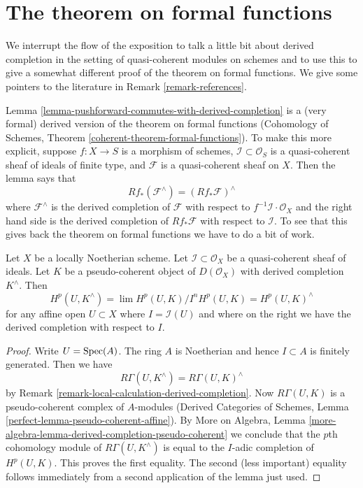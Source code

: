\section{The theorem on formal functions}
\label{section-formal-functions}

\noindent
We interrupt the flow of the exposition to talk a little bit about
derived completion in the setting of quasi-coherent modules on schemes
and to use this to give a somewhat different proof of the theorem on
formal functions. We give some pointers to the literature in
Remark \ref{remark-references}.

\medskip\noindent
Lemma \ref{lemma-pushforward-commutes-with-derived-completion} is a
(very formal) derived version of the theorem on formal functions
(Cohomology of Schemes, Theorem \ref{coherent-theorem-formal-functions}).
To make this more explicit, suppose $f : X \to S$ is a morphism of schemes,
$\mathcal{I} \subset \mathcal{O}_S$ is a quasi-coherent sheaf of ideals
of finite type,
and $\mathcal{F}$ is a quasi-coherent sheaf on $X$. Then the lemma says that
\begin{equation}
\label{equation-formal-functions}
Rf_*(\mathcal{F}^\wedge) = (Rf_*\mathcal{F})^\wedge
\end{equation}
where $\mathcal{F}^\wedge$ is the derived completion of $\mathcal{F}$
with respect to $f^{-1}\mathcal{I} \cdot \mathcal{O}_X$ and the right
hand side is the derived completion of $Rf_*\mathcal{F}$
with respect to $\mathcal{I}$. To see that this gives back the theorem
on formal functions we have to do a bit of work.

\begin{lemma}
\label{lemma-sections-derived-completion-pseudo-coherent}
Let $X$ be a locally Noetherian scheme. Let $\mathcal{I} \subset \mathcal{O}_X$
be a quasi-coherent sheaf of ideals. Let $K$ be a
pseudo-coherent object of $D(\mathcal{O}_X)$ with derived completion
$K^\wedge$. Then
$$
H^p(U, K^\wedge) = \lim H^p(U, K)/I^nH^p(U, K) =
H^p(U, K)^\wedge
$$
for any affine open $U \subset X$
where $I = \mathcal{I}(U)$ and where on the right we have the derived
completion with respect to $I$.
\end{lemma}

\begin{proof}
Write $U = \mathop{\mathrm{Spec}}(A)$. The ring $A$ is Noetherian
and hence $I \subset A$ is finitely generated. Then we have
$$
R\Gamma(U, K^\wedge) = R\Gamma(U, K)^\wedge
$$
by Remark \ref{remark-local-calculation-derived-completion}.
Now $R\Gamma(U, K)$ is a pseudo-coherent complex of $A$-modules
(Derived Categories of Schemes, Lemma
\ref{perfect-lemma-pseudo-coherent-affine}).
By More on Algebra, Lemma
\ref{more-algebra-lemma-derived-completion-pseudo-coherent}
we conclude that the $p$th cohomology module of $R\Gamma(U, K^\wedge)$
is equal to the $I$-adic completion of $H^p(U, K)$.
This proves the first equality. The second (less important) equality
follows immediately from a second application of the lemma just used.
\end{proof}

